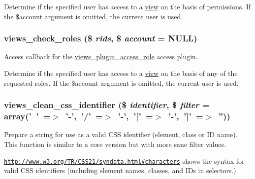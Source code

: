 Determine if the specified user has access to a \hyperlink{classview}{view} on the basis of permissions. If the \$account argument is omitted, the current user is used. \hypertarget{views_8module_aff4ad7e99455055e33d13bc6394bea69}{
\subsubsection[{views\_\-check\_\-roles}]{\setlength{\rightskip}{0pt plus 5cm}views\_\-check\_\-roles (\$ {\em rids}, \/  \$ {\em account} = {\ttfamily NULL})}}
\label{views_8module_aff4ad7e99455055e33d13bc6394bea69}
Access callback for the \hyperlink{classviews__plugin__access__role}{views\_\-plugin\_\-access\_\-role} access plugin.

Determine if the specified user has access to a \hyperlink{classview}{view} on the basis of any of the requested roles. If the \$account argument is omitted, the current user is used. \hypertarget{views_8module_ab664f954156e8a19e30b4db39812fad6}{
\subsubsection[{views\_\-clean\_\-css\_\-identifier}]{\setlength{\rightskip}{0pt plus 5cm}views\_\-clean\_\-css\_\-identifier (\$ {\em identifier}, \/  \$ {\em filter} = {\ttfamily array('~'~=$>$~'-\/',~'/'~=$>$~'-\/',~'\mbox{[}'~=$>$~'-\/',~'\mbox{]}'~=$>$~'')})}}
\label{views_8module_ab664f954156e8a19e30b4db39812fad6}
Prepare a string for use as a valid CSS identifier (element, class or ID name). This function is similar to a core version but with more sane filter values.

\href{http://www.w3.org/TR/CSS21/syndata.html#characters}{\tt http://www.w3.org/TR/CSS21/syndata.html\#characters} shows the syntax for valid CSS identifiers (including element names, classes, and IDs in selectors.)


